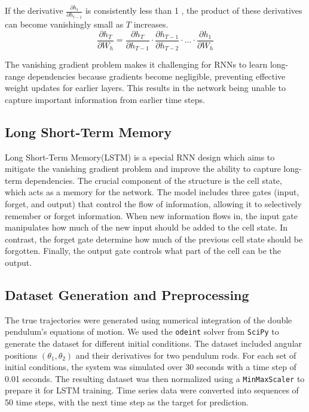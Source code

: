 \documentclass[12pt]{article}
\begin{document}
\noindent If the derivative $\frac{\partial h_t}{\partial h_{t-1}}$ is consistently less than 1 , the product of these derivatives can become vanishingly small as $T$ increases.
\begin{equation}
    \frac{\partial h_T}{\partial W_{h}} = \frac{\partial h_T}{\partial h_{T-1}} \cdot \frac{\partial h_{T-1}}{\partial h_{T-2}} \cdot ... \cdot \frac{\partial h_1}{\partial W_{h}}
\end{equation}

\noindent The vanishing gradient problem makes it challenging for RNNs to learn long-range dependencies because gradients become negligible, preventing effective weight updates for earlier layers. This results in the network being unable to capture important information from earlier time steps\cite{noh2021analysis}.

\subsection{Long Short-Term Memory}
Long Short-Term Memory(LSTM) is a special RNN design which aims to mitigate the vanishing gradient problem and improve the ability to capture long-term dependencies. The crucial component of the structure is 
the cell state, which acts as a memory for the network. 
The model includes three gates (input, forget, and output) that control the flow of information, allowing it to selectively remember or forget information. When new information flows in, 
the input gate manipulates how much of the new input should be added to the cell state. In contrast, the forget gate determine how much of the previous cell state should be forgotten. Finally, 
the output gate controls what part of the cell can be the output\cite{sherstinsky2020fundamentals}.  

\subsection{Dataset Generation and Preprocessing}
The true trajectories were generated using numerical integration of the double pendulum's equations of motion. We used the \texttt{odeint} solver from \texttt{SciPy} to generate the dataset for different initial conditions. The dataset included angular positions $(\theta_1, \theta_2)$ and their derivatives for two pendulum rods. 
For each set of initial conditions, the system was simulated over 30 seconds with a time step of 0.01 seconds. The resulting dataset was then normalized using a \texttt{MinMaxScaler} to prepare it for LSTM training. Time series data were converted into sequences of 50 time steps, with the next time step as the target for prediction.
\end{document}
